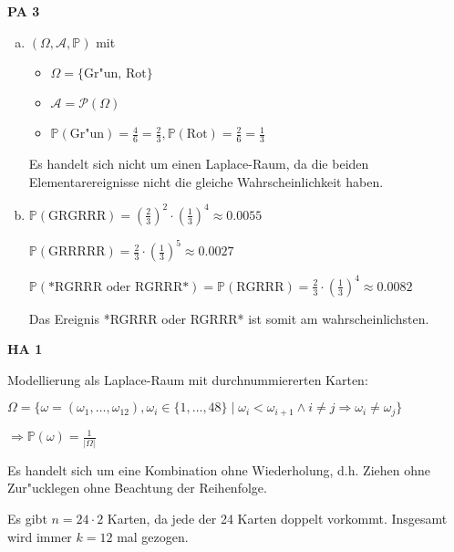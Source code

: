 \documentclass[a4paper,12pt]{article}
\newcommand{\Aufgabe}[1]{
        {
        \vspace*{0.5cm}
        \textbf{HA #1}
        \vspace*{0.2cm}
    }
}
\newcommand{\PAufgabe}[1]{
        {
        \vspace*{0.5cm}
        \textbf{PA #1}
        \vspace*{0.2cm}
    }
}
\begin{document}
    \PAufgabe{3}
    \begin{enumerate}[(a)]
        \item 

        $ (\Omega, \mathcal{A}, \mathbb{P}) $ mit
        \begin{itemize}
            \item $ \Omega = \{\text{Gr"un, Rot}\} $
            \item $ \mathcal{A} = \mathcal{P}(\Omega) $
            \item $ \displaystyle \mathbb{P}(\text{Gr"un}) = \frac{4}{6} = \frac{2}{3}, \mathbb{P}(\text{Rot}) = \frac{2}{6} = \frac{1}{3} $
        \end{itemize}

        Es handelt sich nicht um einen Laplace-Raum, da die beiden Elementarereignisse nicht die gleiche Wahrscheinlichkeit haben.

        \item

        $ \displaystyle \mathbb{P}(\text{GRGRRR}) = (\frac{2}{3})^2 \cdot (\frac{1}{3})^4 \approx 0.0055 $

        $ \displaystyle \mathbb{P}(\text{GRRRRR}) = \frac{2}{3} \cdot (\frac{1}{3})^5 \approx 0.0027 $

        $ \displaystyle \mathbb{P}(\text{*RGRRR oder RGRRR*}) = \mathbb{P}(\text{RGRRR}) = \frac{2}{3} \cdot (\frac{1}{3})^4 \approx 0.0082 $

        Das Ereignis *RGRRR oder RGRRR* ist somit am wahrscheinlichsten.
    \end{enumerate}

    \Aufgabe{1} 

    Modellierung als Laplace-Raum mit durchnummiererten Karten:

    $ \Omega = \{\omega = (\omega_1, \dots, \omega_{12}), \omega_i \in \{1, \dots, 48\} \mid \omega_i < \omega_{i + 1} \land i \neq j \Rightarrow \omega_i \neq \omega_j\} $

    $ \displaystyle \Rightarrow \mathbb{P}(\omega) = \frac{1}{|\Omega|} $

    Es handelt sich um eine Kombination ohne Wiederholung, d.h. Ziehen ohne Zur"ucklegen ohne Beachtung der Reihenfolge.

    \bigskip

    Es gibt $ n = 24 \cdot 2 $ Karten, da jede der 24 Karten doppelt vorkommt. Insgesamt wird immer $ k = 12 $ mal gezogen.

    \bigskip
\end{document}
